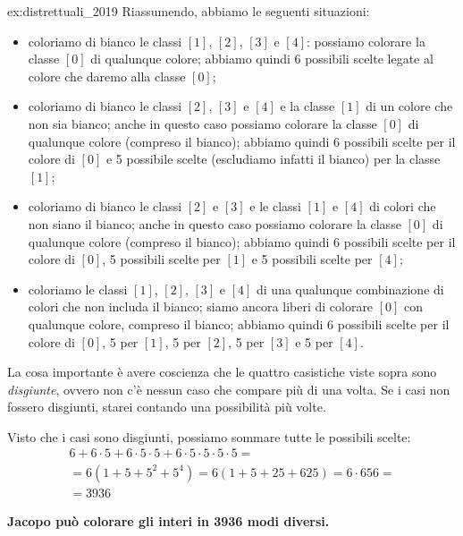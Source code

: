 \begin{soluzione}{ex:distrettuali_2019}
    Riassumendo, abbiamo le seguenti situazioni:
    \begin{itemize}
        \item coloriamo di bianco le classi $[1]$, $[2]$, $[3]$ e $[4]$:
        possiamo colorare la classe $[0]$ di qualunque colore;
        abbiamo quindi 6 possibili scelte legate al colore che daremo alla classe $[0]$;
        \item coloriamo di bianco le classi $[2]$, $[3]$ e $[4]$ e la classe $[1]$ di un colore che non sia bianco;
        anche in questo caso possiamo colorare la classe $[0]$ di qualunque colore (compreso il bianco);
        abbiamo quindi 6 possibili scelte per il colore di $[0]$ e 5 possibile scelte (escludiamo infatti il bianco)
        per la classe $[1]$;
        \item coloriamo di bianco le classi $[2]$ e $[3]$ e le classi $[1]$ e $[4]$ di colori che non siano il bianco;
        anche in questo caso possiamo colorare la classe $[0]$ di qualunque colore (compreso il bianco);
        abbiamo quindi 6 possibili scelte per il colore di $[0]$, 5 possibili scelte per $[1]$ e 5 possibili scelte
        per $[4]$;
        \item coloriamo le classi $[1]$, $[2]$, $[3]$ e $[4]$ di una qualunque combinazione di colori che non includa
        il bianco;
        siamo ancora liberi di colorare $[0]$ con qualunque colore, compreso il bianco;
        abbiamo quindi 6 possibili scelte per il colore di $[0]$, 5 per $[1]$, 5 per $[2]$, 5 per $[3]$ e 5 per $[4]$.
    \end{itemize}

    La cosa importante è avere coscienza che le quattro casistiche viste sopra sono \emph{disgiunte}, ovvero non c'è
    nessun caso che compare più di una volta.
    Se i casi non fossero disgiunti, starei contando una possibilità più volte.

    Visto che i casi sono disgiunti, possiamo sommare tutte le possibili scelte:
    \begin{multline*}
        6 + 6 \cdot 5 + 6 \cdot 5 \cdot 5 + 6 \cdot 5 \cdot 5 \cdot 5 \cdot 5 = \\
        = 6(1 + 5 + 5^2 + 5^4) = 6(1 + 5 + 25 + 625) = 6 \cdot 656 = \\
        = 3936
    \end{multline*}

    \bigskip
    \textbf{Jacopo può colorare gli interi in 3936 modi diversi.}
\end{soluzione}

